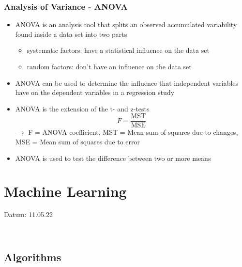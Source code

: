 \documentclass[12pt,a4paper]{article}
\begin{document}
\subsubsection{Analysis of Variance - ANOVA} %
\label{ssub:analysis_of_variance_anova}
\begin{itemize}
  \item ANOVA is an analysis tool that splits an observed accumulated variability found inside a data set into two parts
  \begin{itemize}
    \item systematic factors: have a statistical influence on the data set
    \item random factors: don't have an influence on the data set
  \end{itemize}
  \item ANOVA can be used to determine the influence that independent variables have on the dependent variables in a regression study
  \item ANOVA is the extension of the t- and z-tests
  \begin{equation}
    F = \frac{\text{MST}}{\text{MSE}}
  \end{equation}
  \newline \indent $\longrightarrow$ F = ANOVA coefficient, MST = Mean sum of squares due to changes, MSE = Mean sum of squares due to error
  \item ANOVA is used to test the difference between two or more means
\end{itemize}






\newpage
\section{Machine Learning}
\addtocounter{section}{1}
Datum: 11.05.22 \ 

\noindent\hrulefill  \


\subsection{Algorithms} %
\label{sub:Algorithms}
\end{document}
